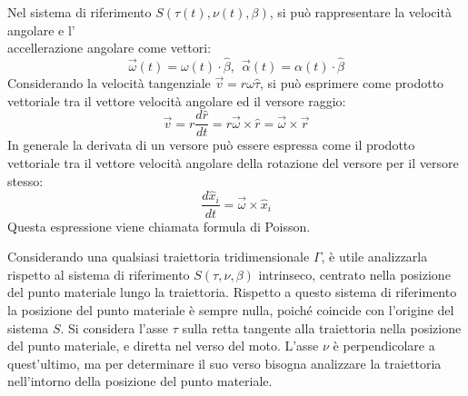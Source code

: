 \documentclass{article}
\numberwithin{equation}{subsection}
\begin{document}
\begin{center}\end{center}

Nel sistema di riferimento $S(\tau(t),\nu(t),\beta)$, 
si può rappresentare 
la velocità angolare e l'\\accellerazione angolare come vettori:
\begin{equation}
    \vec{\omega}(t)=\omega(t)\cdot\hat{\beta}{,}\:\: \vec{\alpha}(t)=\alpha(t)\cdot\hat{\beta}
\end{equation}
Considerando la velocità tangenziale $\vec{v}=r\omega\hat\tau$, si può esprimere come prodotto vettoriale tra il vettore velocità angolare ed il versore raggio: 
\begin{equation*}
    \vec{v}=r\displaystyle\frac{d\hat{r}}{dt}=r\vec\omega\times\hat{r}=\vec\omega\times\vec{r}
\end{equation*}
In generale la derivata di un versore può essere espressa come il prodotto vettoriale tra il vettore velocità angolare della rotazione del versore per il versore stesso:
\begin{equation}
    \displaystyle\frac{d\hat{x}_i}{dt}=\vec\omega\times\hat{x}_i
\end{equation}
Questa espressione viene chiamata formula di Poisson. 



Considerando una qualsiasi traiettoria tridimensionale $\Gamma$, è utile analizzarla rispetto al sistema di riferimento $S(\tau,\nu,\beta)$ intrinseco, centrato nella 
posizione del punto materiale lungo la traiettoria. Rispetto a questo sistema di riferimento la posizione del punto materiale è sempre nulla, poiché coincide con l'origine 
del sistema $S$. Si considera l'asse $\tau$ sulla retta tangente alla traiettoria nella posizione del punto materiale, e diretta nel verso del moto. L'asse $\nu$ è perpendicolare 
a quest'ultimo, ma per determinare il suo verso bisogna analizzare la traiettoria nell'intorno della posizione del punto materiale. 
\end{document}
